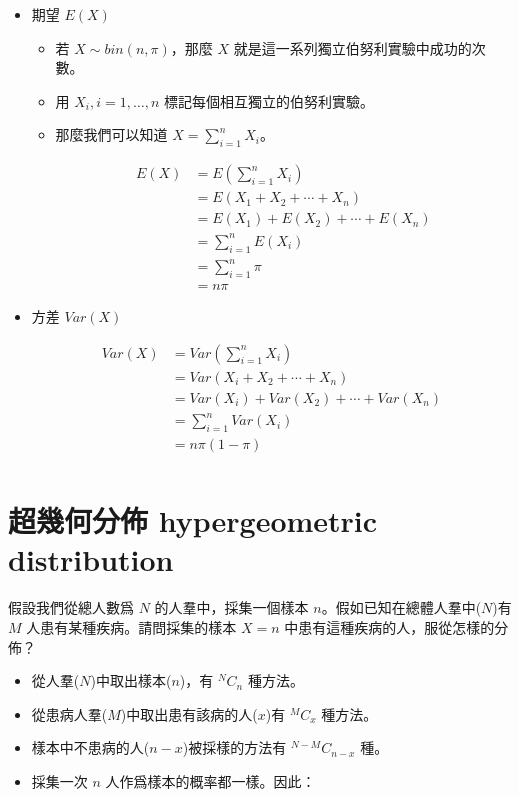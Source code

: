 \documentclass[]{ctexbook}
\providecommand{\tightlist}{%
  \setlength{\itemsep}{0pt}\setlength{\parskip}{0pt}}
\begin{document}
\begin{itemize}
\tightlist
\item
  期望 \(E(X)\)

  \begin{itemize}
  \tightlist
  \item
    若 \(X \sim bin(n,\pi)\)，那麼 \(X\)
    就是這一系列獨立伯努利實驗中成功的次數。
  \item
    用 \(X_i, i =1,\dots, n\) 標記每個相互獨立的伯努利實驗。
  \item
    那麼我們可以知道 \(X=\sum_{i=1}^nX_i\)。

    \begin{align} E(X) &= E(\sum_{i=1}^nX_i)\\
                     &= E(X_1+X_2+\cdots+X_n) \\
                     &= E(X_1)+E(X_2)+\cdots+E(X_n)\\
                     &= \sum_{i=1}^nE(X_i)\\
                     &= \sum_{i=1}^n\pi \\
                     &= n\pi
      \end{align}
  \end{itemize}
\item
  方差 \(Var(X)\)

  \begin{align}
  Var(X) &= Var(\sum_{i=1}^nX_i) \\
      &= Var(X_i+X_2+\cdots+X_n) \\
      &= Var(X_i)+Var(X_2)+\cdots+Var(X_n) \\
      &= \sum_{i=1}^nVar(X_i) \\
      &= n\pi(1-\pi) \\
  \end{align}
\end{itemize}

\section{超幾何分佈 hypergeometric
distribution}\label{-hypergeometric-distribution}

假設我們從總人數爲 \(N\) 的人羣中，採集一個樣本
\(n\)。假如已知在總體人羣中(\(N\))有 \(M\)
人患有某種疾病。請問採集的樣本 \(X=n\)
中患有這種疾病的人，服從怎樣的分佈？

\begin{itemize}
\tightlist
\item
  從人羣(\(N\))中取出樣本(\(n\))，有 \(^NC_n\) 種方法。
\item
  從患病人羣(\(M\))中取出患有該病的人(\(x\))有 \(^MC_x\) 種方法。
\item
  樣本中不患病的人(\(n-x\))被採樣的方法有 \(^{N-M}C_{n-x}\) 種。
\item
  採集一次 \(n\) 人作爲樣本的概率都一樣。因此：
\end{itemize}
\end{document}
